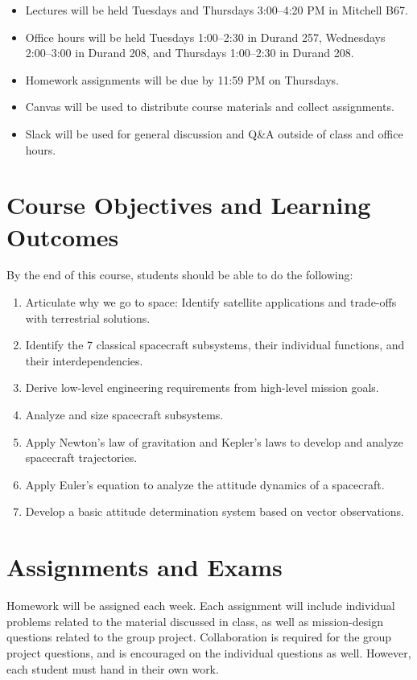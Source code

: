 \documentclass[11pt,letterpaper]{article}
\begin{document}
\begin{itemize}
	\item Lectures will be held Tuesdays and Thursdays 3:00--4:20 PM in Mitchell B67.
	\item Office hours will be held Tuesdays 1:00--2:30 in Durand 257, Wednesdays 2:00--3:00 in Durand 208, and Thursdays 1:00--2:30 in Durand 208.
	\item Homework assignments will be due by 11:59 PM on Thursdays.
	\item Canvas will be used to distribute course materials and collect assignments.
	\item Slack will be used for general discussion and Q\&A outside of class and office hours.
\end{itemize}

\section*{Course Objectives and Learning Outcomes}
By the end of this course, students should be able to do the following:
\begin{enumerate}
	\item Articulate why we go to space: Identify satellite applications and trade-offs with terrestrial solutions.
	\item Identify the 7 classical spacecraft subsystems, their individual functions, and their interdependencies.
	\item Derive low-level engineering requirements from high-level mission goals.
	\item Analyze and size spacecraft subsystems.
	\item Apply Newton's law of gravitation and Kepler's laws to develop and analyze spacecraft trajectories.
	\item Apply Euler's equation to analyze the attitude dynamics of a spacecraft.
	\item Develop a basic attitude determination system based on vector observations.
	
\end{enumerate}

\section*{Assignments and Exams}

Homework will be assigned each week. Each assignment will include individual problems related to the material discussed in class, as well as mission-design questions related to the group project. Collaboration is required for the group project questions, and is encouraged on the individual questions as well. However, each student must hand in their own work.
\end{document}
